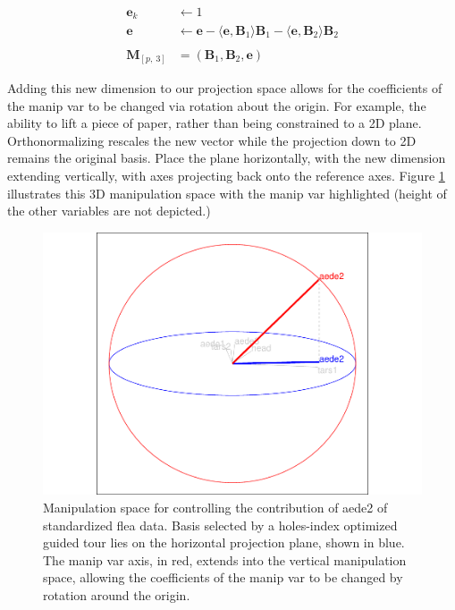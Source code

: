 \begin{align*}
  \textbf{e}_k &\leftarrow 1 \\ 
  \textbf{e}   &\leftarrow \textbf{e} - \langle \textbf{e}, \textbf{B}_1 \rangle \textbf{B}_1 - \langle \textbf{e}, \textbf{B}_2 \rangle \textbf{B}_2 \\ 
  &\\
  \textbf{M}_{[p,~3]} &= (\textbf{B}_1,\textbf{B}_2,\textbf{e})
\end{align*}

Adding this new dimension to our projection space allows for the
coefficients of the manip var to be changed via rotation about the
origin. For example, the ability to lift a piece of paper, rather than
being constrained to a 2D plane. Orthonormalizing rescales the new
vector while the projection down to 2D remains the original basis. Place
the plane horizontally, with the new dimension extending vertically,
with axes projecting back onto the reference axes. Figure
\ref{fig:step2} illustrates this 3D manipulation space with the manip
var highlighted (height of the other variables are not depicted.)

\begin{Schunk}
\begin{figure}

{\centering \includegraphics[width=0.6\linewidth]{spinifex_paper_files/figure-latex/step2-1} 

}

\caption[Manipulation space for controlling the contribution of aede2 of standardized flea data]{Manipulation space for controlling the contribution of aede2 of standardized flea data. Basis selected by a holes-index optimized guided tour lies on the horizontal projection plane, shown in blue. The manip var axis, in red, extends into the vertical manipulation space, allowing the coefficients of the manip var to be changed by rotation around the origin.}\label{fig:step2}
\end{figure}
\end{Schunk}

